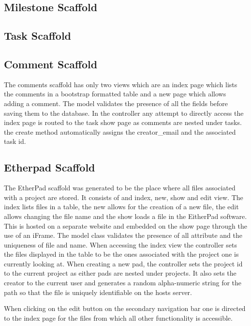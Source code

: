 \documentclass[a4wide, 11pt]{article}
\begin{document}
\subsection{Milestone Scaffold}

\subsection{Task Scaffold}

\subsection{Comment Scaffold}
The comments scaffold has only two views which are an index page which lists the comments in a bootstrap formatted table and a new page which allows adding a comment. The model validates the presence of all the fields before saving them to the database. In the controller any attempt to directly access the index page is routed to the task show page as comments are nested under tasks. the create method automatically assigns the creator_email and the associated task id.

\subsection{Etherpad Scaffold}
The EtherPad scaffold was generated to be the place where all files associated with a project are stored. It consists of and index, new, show and edit view. The index lists files in a table, the new allows for the creation of a new file, the edit allows changing the file name and the show loads a file in the EitherPad software. This is hosted on a separate website and embedded on the show page through the use of an iFrame. The model class validates the presence of all attribute and the uniqueness of file and name. When accessing the index view the controller sets the files displayed in the table to be the ones associated with the project one is currently looking at. When creating a new pad, the controller sets the project id to the current project as either pads are nested under projects. It also sets the creator to the current user and generates a random alpha-numeric string for the path so that the file is uniquely identifiable on the hosts server. 

When clicking on the edit button on the secondary navigation bar one is directed to the index page for the files from which all other functionality is accessible. 
\end{document}
